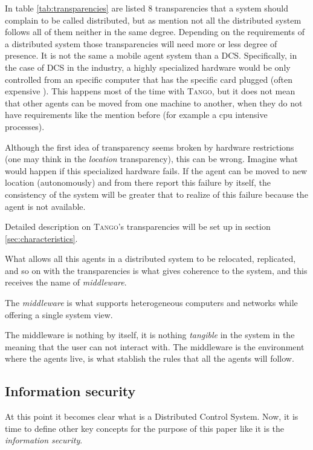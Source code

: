 \documentclass[10pt,a4paper,twoside]{llncs}
\newcommand{\tango}{\textsc{Tango}}
\begin{document}
In table \ref{tab:transparencies} are listed 8 transparencies that a system should complain to be called distributed, but as mention not all the distributed system follows all of them neither in the same degree. Depending on the requirements of a distributed system those transparencies will need more or less degree of presence. It is not the same a mobile agent system than a DCS. Specifically, in the case of DCS in the industry, a highly specialized hardware would be only controlled from an specific computer that has the specific card plugged (often expensive	). This happens most of the time with \tango, but it does not mean that other agents can be moved from one machine to another, when they do not have requirements like the mention before (for example a cpu intensive processes).

Although the first idea of transparency seems broken by hardware restrictions (one may think in the \emph{location} transparency), this can be wrong. Imagine what would happen if this specialized hardware fails. If the agent can be moved to new location (autonomously) and from there report this failure by itself, the consistency of the system will be greater that to realize of this failure because the agent is not available.

Detailed description on \tango's transparencies will be set up in section \ref{sec:characteristics}.

What allows all this agents in a distributed system to be relocated, replicated, and so on with the transparencies is what gives coherence to the system, and this receives the name of \emph{middleware}.

\begin{definition}\label{def:middleware}
    The \emph{middleware} is what supports heterogeneous computers and networks while offering a single system view.
\end{definition}

The middleware is nothing by itself, it is nothing \emph{tangible} in the system in the meaning that the user can not interact with. The middleware is the environment where the agents live, is what stablish the rules that all the agents will follow.

\subsection{Information security}\label{sec:InfoSec}

At this point it becomes clear what is a Distributed Control System. Now, it is time to define other key concepts for the purpose of this paper like it is the \emph{information security}. 
\end{document}
